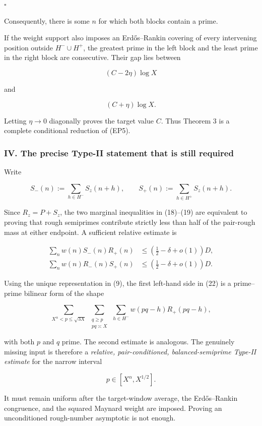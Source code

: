 \(\square\)

Consequently, there is some \(n\) for which both blocks contain a prime.

If the weight support also imposes an Erdős--Rankin covering of every intervening position outside \(H^-\cup H^+\), the greatest prime in the left block and the least prime in the right block are consecutive. Their gap lies between

\[
(C-2\eta)\log X
\]

and

\[
(C+\eta)\log X.
\]

Letting \(\eta\to0\) diagonally proves the target value \(C\). Thus Theorem 3 is a complete conditional reduction of (EP5).

\subsubsection*{IV. The precise Type-II statement that is still required}

Write

\[
S_-(n):=\sum_{h\in H^-}S_z(n+h),
\qquad
S_+(n):=\sum_{h\in H^+}S_z(n+h).
\]

Since \(R_z=P+S_z\), the two marginal inequalities in (18)--(19) are equivalent to proving that rough semiprimes contribute strictly less than half of the pair-rough mass at either endpoint. A sufficient relative estimate is

\[
\boxed{
\begin{aligned}
\sum_n w(n)S_-(n)R_+(n)
&\le
\left(\frac12-\delta+o(1)\right)D,\\
\sum_n w(n)R_-(n)S_+(n)
&\le
\left(\frac12-\delta+o(1)\right)D.
\end{aligned}
}
\tag{22}
\]

Using the unique representation in (9), the first left-hand side in (22) is a prime--prime bilinear form of the shape

\[
\sum_{X^\alpha<p\le\sqrt{3X}}
\ \sum_{\substack{q\ge p\\pq\asymp X}}
\ \sum_{h\in H^-}
w(pq-h)R_+(pq-h),
\tag{23}
\]

with both \(p\) and \(q\) prime. The second estimate is analogous. The genuinely missing input is therefore a \emph{relative, pair-conditioned, balanced-semiprime Type-II estimate} for the narrow interval

\[
p\in[X^\alpha,X^{1/2}].
\tag{24}
\]

It must remain uniform after the target-window average, the Erdős--Rankin congruence, and the squared Maynard weight are imposed. Proving an unconditioned rough-number asymptotic is not enough.

